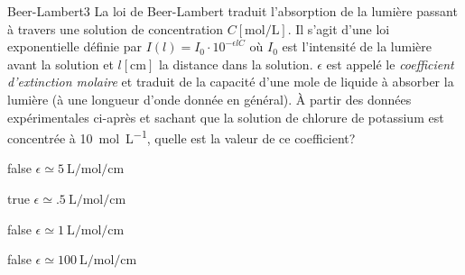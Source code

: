 \documentclass[11pt]{article}
\begin{document}
		\begin{question}{27}{Beer-Lambert}{3}{}
            La loi de Beer-Lambert traduit l'absorption de la lumière passant à travers une solution de concentration $C[\si{\mole\per\liter}]$. Il s'agit d'une loi exponentielle définie par $I(l) = I_0\cdot 10^{-\epsilon l C}$ où $I_0$ est l'intensité de la lumière avant la solution et  $l[\si{\centi\meter}]$ la distance dans la solution. $\epsilon$ est appelé le \emph{coefficient d'extinction molaire} et traduit de la capacité d'une mole de liquide à absorber la lumière (à une longueur d'onde donnée en général). À partir des données expérimentales ci-après et sachant que la solution de chlorure de potassium est concentrée à \SI{10}{\mole\per\liter}, quelle est la valeur de ce coefficient?
            \begin{figure}
             \end{figure}
        \end{question}
        \begin{reponses}
            \item[false] $\epsilon \simeq \SI{5}{\liter\per\mole\per\centi\meter}$
		    \item[true] $\epsilon \simeq \SI{.5}{\liter\per\mole\per\centi\meter}$
		    \item[false] $\epsilon \simeq \SI{1}{\liter\per\mole\per\centi\meter}$
		    \item[false] $\epsilon \simeq \SI{100}{\liter\per\mole\per\centi\meter}$
	    \end{reponses}
		
\end{document}
